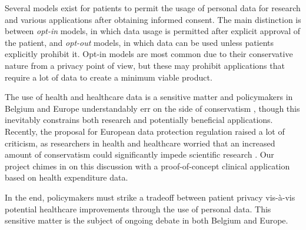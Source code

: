 Several models exist for patients to permit the usage of personal data for research and various applications after obtaining informed consent. The main distinction is between \emph{opt-in} models, in which data usage is permitted after explicit approval of the patient, and \emph{opt-out} models, in which data can be used unless patients explicitly prohibit it. Opt-in models are most common due to their conservative nature from a privacy point of view, but these may prohibit applications that require a lot of data to create a minimum viable product. 

The use of health and healthcare data is a sensitive matter and policymakers in Belgium and Europe understandably err on the side of conservatism \citep{privacywet, eu_data}, though this inevitably constrains both research and potentially beneficial applications. Recently, the proposal for European data protection regulation raised a lot of criticism, as researchers in health and healthcare worried that an increased amount of conservatism could significantly impede scientific research \citep{feam_2, cumbley2013big, fears2014data, wellcome_position_statement, feam_1}. Our project chimes in on this discussion with a proof-of-concept clinical application based on health expenditure data.

In the end, policymakers must strike a tradeoff between patient privacy vis-\`a-vis potential healthcare improvements through the use of personal data. This sensitive matter is the subject of ongoing debate in both Belgium and Europe. 




\cleardoublepage

